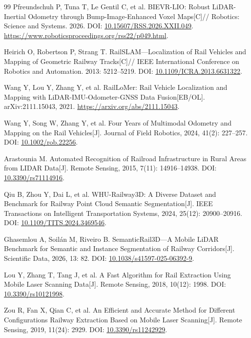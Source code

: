\documentclass[UTF8,a4paper,12pt,fontset=fandol]{ctexart}
\begin{document}
\begin{thebibliography}{99}
Pfreundschuh P, Tuna T, Le Gentil C, et al.
BIEVR-LIO: Robust LiDAR-Inertial Odometry through Bump-Image-Enhanced Voxel Maps[C]//
Robotics: Science and Systems. 2026.
DOI: \href{https://doi.org/10.15607/RSS.2026.XXII.049}{10.15607/RSS.2026.XXII.049}.
\url{https://www.roboticsproceedings.org/rss22/p049.html}.

Heirich O, Robertson P, Strang T.
RailSLAM---Localization of Rail Vehicles and Mapping of Geometric Railway Tracks[C]//
IEEE International Conference on Robotics and Automation. 2013: 5212--5219.
DOI: \href{https://doi.org/10.1109/ICRA.2013.6631322}{10.1109/ICRA.2013.6631322}.

Wang Y, Lou Y, Zhang Y, et al.
RailLoMer: Rail Vehicle Localization and Mapping with LiDAR-IMU-Odometer-GNSS Data Fusion[EB/OL].
arXiv:2111.15043, 2021.
\url{https://arxiv.org/abs/2111.15043}.

Wang Y, Song W, Zhang Y, et al.
Four Years of Multimodal Odometry and Mapping on the Rail Vehicles[J].
Journal of Field Robotics, 2024, 41(2): 227--257.
DOI: \href{https://doi.org/10.1002/rob.22256}{10.1002/rob.22256}.

Arastounia M.
Automated Recognition of Railroad Infrastructure in Rural Areas from LIDAR Data[J].
Remote Sensing, 2015, 7(11): 14916--14938.
DOI: \href{https://doi.org/10.3390/rs71114916}{10.3390/rs71114916}.

Qiu B, Zhou Y, Dai L, et al.
WHU-Railway3D: A Diverse Dataset and Benchmark for Railway Point Cloud Semantic Segmentation[J].
IEEE Transactions on Intelligent Transportation Systems, 2024, 25(12): 20900--20916.
DOI: \href{https://doi.org/10.1109/TITS.2024.3469546}{10.1109/TITS.2024.3469546}.

Ghasemlou A, Soilán M, Riveiro B.
SemanticRail3D---A Mobile LiDAR Benchmark for Semantic and Instance Segmentation of Railway Corridors[J].
Scientific Data, 2026, 13: 82.
DOI: \href{https://doi.org/10.1038/s41597-025-06392-9}{10.1038/s41597-025-06392-9}.

Lou Y, Zhang T, Tang J, et al.
A Fast Algorithm for Rail Extraction Using Mobile Laser Scanning Data[J].
Remote Sensing, 2018, 10(12): 1998.
DOI: \href{https://doi.org/10.3390/rs10121998}{10.3390/rs10121998}.

Zou R, Fan X, Qian C, et al.
An Efficient and Accurate Method for Different Configurations Railway Extraction Based on Mobile Laser Scanning[J].
Remote Sensing, 2019, 11(24): 2929.
DOI: \href{https://doi.org/10.3390/rs11242929}{10.3390/rs11242929}.


\end{thebibliography}
\end{document}
